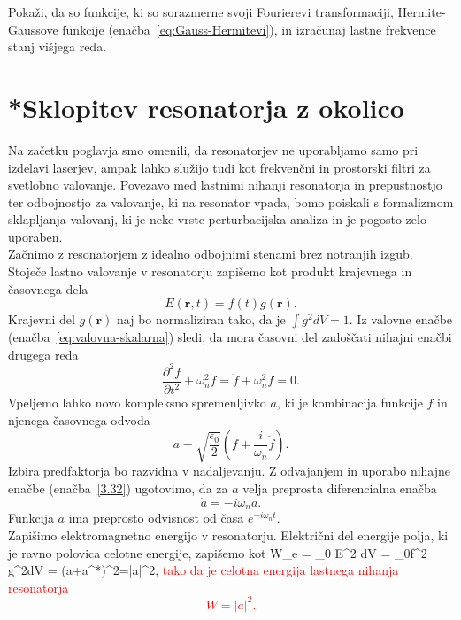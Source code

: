 \begin{definition}
Pokaži, da so funkcije, ki so sorazmerne svoji Fourierevi transformaciji, 
Hermite-Gaussove funkcije (enačba~\ref{eq:Gauss-Hermitevi}), in 
izračunaj lastne frekvence stanj višjega reda.
\end{definition}

\section{*Sklopitev resonatorja z okolico}
Na začetku poglavja smo omenili, da resonatorjev ne uporabljamo samo pri 
izdelavi laserjev, ampak lahko služijo tudi kot frekvenčni in
prostorski filtri za svetlobno valovanje. Povezavo med lastnimi nihanji
resonatorja in prepustnostjo ter odbojnostjo za valovanje, ki na resonator
vpada, bomo poiskali s formalizmom sklapljanja valovanj, 
ki je neke vrste perturbacijska analiza in je pogosto zelo uporaben.\\

Začnimo z resonatorjem z idealno odbojnimi stenami brez notranjih izgub. Stoječe
lastno valovanje v resonatorju zapišemo kot produkt krajevnega in časovnega
dela
\begin{equation}
E(\mathbf{r},t)=f(t)g(\mathbf{r}).
\label{3.31}
\end{equation}
Krajevni del $g(\mathbf{r})$ naj bo normaliziran tako, da je $\int g^{2}dV=1$. Iz valovne
enačbe (enačba~\ref{eq:valovna-skalarna}) sledi, da mora časovni del zadoščati 
nihajni enačbi drugega reda
\begin{equation}
\frac{\partial^2 f}{\partial t^2}+\omega_{n}^{2}f= \ddot{f} + \omega_{n}^{2}f=0.
\label{3.32}
\end{equation}
Vpeljemo lahko novo kompleksno spremenljivko $a$, ki je kombinacija funkcije $f$ in njenega
časovnega odvoda
\begin{equation}
a=\sqrt{\frac{\epsilon_{0}}{2}}(f+\frac{i}{\omega_{n}}\dot{f}).
\label{3.33}
\end{equation}
Izbira predfaktorja bo razvidna v nadaljevanju. 
Z odvajanjem in uporabo nihajne enačbe (enačba~\ref{3.32}) ugotovimo, da za $a$ velja 
preprosta diferencialna enačba 
\begin{equation}
\dot{a}=-i\omega_{n}a.
\label{3.34}
\end{equation}
Funkcija $a$ ima preprosto odvisnost od časa $e^{-i\omega_{n}t}$. \\

Zapišimo elektromagnetno energijo v resonatorju. Električni
del energije polja, ki je ravno polovica celotne energije, zapišemo kot
\beq
W_e = \varepsilon_0 \int E^2 dV = \epsilon_{0}f^{2}
\int g^{2}dV =  (a+a^{*})^2=|a|^{2},
\eeq
\textcolor{red}{tako da je celotna energija lastnega nihanja resonatorja 
\begin{equation}
W=|a|^{2}.
\label{3.35}
\end{equation}}

